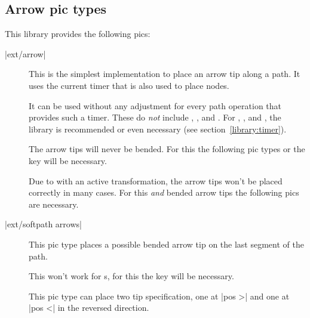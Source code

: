\begin{multicols}{2}
\subsection{Arrow pic types}

This library provides the following pics:
\begin{description}
\item[|ext/arrow|]
  This is the simplest implementation to place an arrow tip along a path.
  It uses the current timer that is also used to place nodes.
  
  It can be used without any adjustment for every path operation that provides such a timer.
  These do \emph{not} include
  ,
  ,
   and
  .
  For ,
      ,
       and
      ,
  the  library is recommended or even necessary
  (see section~\ref{library:timer}).
  
  The arrow tips will never be bended. For this the following pic types
  or the  key will be necessary.

  Due to \cite{PgfIssueSloped} with an active transformation,
  the arrow tips won't be placed correctly in many cases.
  For this \emph{and} bended arrow tips the following pics are necessary.
  
\item[|ext/softpath arrows|]
  This pic type places a possible bended arrow tip on the last segment of the path.
  
  
  This won't work for s,
  for this the  key will be necessary.
  
  This pic type can place two tip specification,
  one at |pos >| and one at |pos <| in the reversed direction.


\end{description}
\end{multicols}
